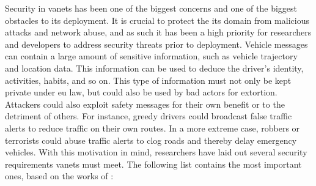 Security in \glspl{vanet} has been one of the biggest concerns and one of the biggest obstacles to its deployment. It is crucial to protect the \gls{its} domain from malicious attacks and network abuse, and as such it has been a high priority for researchers and developers to address security threats prior to deployment.
Vehicle messages can contain a large amount of sensitive information, such as vehicle trajectory and location data. This information can be used to deduce the driver's identity, activities, habits, and so on. This type of information must not only be kept private under \gls{eu} law, but could also be used by bad actors for extortion.\cite{liang_vehicular_2015} \cite{malhi_security_2020}
Attackers could also exploit safety messages for their own benefit or to the detriment of others. For instance, greedy drivers could broadcast false traffic alerts to reduce traffic on their own routes. In a more extreme case, robbers or terrorists could abuse traffic alerts to clog roads and thereby delay emergency vehicles. \cite{malhi_security_2020}
With this motivation in mind, researchers have laid out several security requirements \glspl{vanet} must meet. The following list contains the most important ones, based on the works of \cite{hasrouny_vanet_2017} \cite{malhi_security_2020}:
